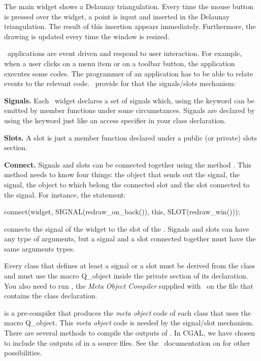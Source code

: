 The main widget shows a
Delaunay triangulation. Every time the mouse button is pressed over 
the widget, a point is input  and inserted in the Delaunay
triangulation. The result of this insertion appears immediately.
Furthermore, the drawing is  updated every time the window is resized.




\qt\ applications are event driven and respond to user interaction.
For example, when a user clicks on a menu item or on a toolbar button,
the application executes some codes. The programmer of an
application has to be able to relate events to the relevant code.
\qt\ provide for that the signals/slots mechanism:
\begin{description}
\item{\bf Signals.}
Each \qt\ widget declares a set of signals which, using the
keyword   can be  emitted by member functions 
under some circumstances. Signals are declared by using 
the keyword  just like an
access specifier in your class declaration.
\item {\bf Slots.}
A slot is just a member function declared under a public (or private)
slots section.
\item{\bf Connect.}
Signals and slots can be connected together using the method 
. This method needs to know four things: the object
that sends out the signal, the signal, 
the object to which belong the connected slot
and the slot connected to the signal.
For instance, the statement:
\begin{ccExampleCode}
connect(widget, SIGNAL(redraw_on_back()),
        this, SLOT(redraw_win()));
\end{ccExampleCode}

connects the signal  of the widget 
to the slot  of the  .
Signals and slots can have any type of arguments, but a signal and a
slot connected together must have the same arguments types.
\end{description}

Every class that defines at least a signal or a slot must be derived
from the class  and must use the macro {\sc Q\_object}
inside the private section of its declaration. You also need to run
, the \emph{Meta Object Compiler} supplied with \qt\, on the
file that contains the class declaration.

 is a pre-compiler that produces the \emph{meta object} code
of each class that uses the macro {\sc Q\_object}. This \emph{meta
  object} code is needed by the signal/slot mechanism. There are
several methods to compile the outputs of . In CGAL, we have
chosen to include the outputs of  in a source files. See the
\qt\ documentation on  for other possibilities.

